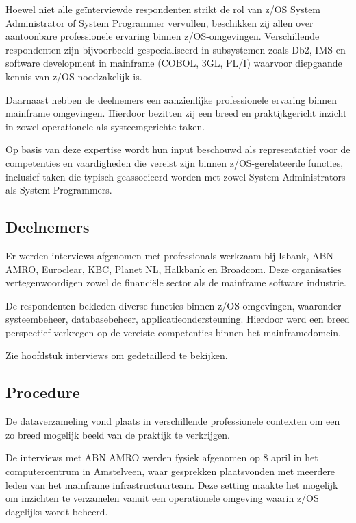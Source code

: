 Hoewel niet alle geïnterviewde respondenten strikt de rol van z/OS System Administrator of System Programmer vervullen, beschikken zij allen over aantoonbare professionele ervaring binnen z/OS-omgevingen. Verschillende respondenten zijn bijvoorbeeld gespecialiseerd in subsystemen zoals Db2, IMS en software development in mainframe (COBOL, 3GL, PL/I) waarvoor diepgaande kennis van z/OS noodzakelijk is.

Daarnaast hebben de deelnemers een aanzienlijke professionele ervaring binnen mainframe omgevingen. Hierdoor bezitten zij een breed en praktijkgericht inzicht in zowel operationele als systeemgerichte taken.

Op basis van deze expertise wordt hun input beschouwd als representatief voor de competenties en vaardigheden die vereist zijn binnen z/OS-gerelateerde functies, inclusief taken die typisch geassocieerd worden met zowel System Administrators als System Programmers.

\subsection{Deelnemers}

Er werden interviews afgenomen met professionals werkzaam bij Isbank, ABN AMRO, Euroclear, KBC, Planet NL, Halkbank en Broadcom. Deze organisaties vertegenwoordigen zowel de financiële sector als de mainframe software industrie.

De respondenten bekleden diverse functies binnen z/OS-omgevingen, waaronder systeembeheer, databasebeheer, applicatieondersteuning. Hierdoor werd een breed perspectief verkregen op de vereiste competenties binnen het mainframedomein.

Zie hoofdstuk interviews om gedetaillerd te bekijken.

\subsection{Procedure}

De dataverzameling vond plaats in verschillende professionele contexten om een zo breed mogelijk beeld van de praktijk te verkrijgen.

De interviews met ABN AMRO werden fysiek afgenomen op 8 april in het computercentrum in Amstelveen, waar gesprekken plaatsvonden met meerdere leden van het mainframe infrastructuurteam. Deze setting maakte het mogelijk om inzichten te verzamelen vanuit een operationele omgeving waarin z/OS dagelijks wordt beheerd.

